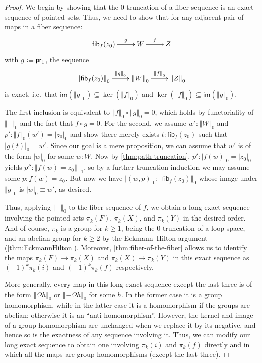 \documentclass[10pt,a4paper]{article}
\providecommand{\index}[1]{}
\newcommand{\jdeq}{\equiv}      %
\newcommand{\defeq}{\vcentcolon\equiv}  %
\newcommand{\proj}[1]{\ensuremath{\mathsf{pr}_{#1}}\xspace}
\newcommand{\im}{\ensuremath{\mathsf{im}}} %
\newcommand{\hfib}[2]{{\mathsf{fib}}_{#1}(#2)}
\newcommand{\trunc}[2]{\mathopen{}\left\Vert #2\right\Vert_{#1}\mathclose{}}
\newcommand{\truncf}[1]{\Vert \blank \Vert_{#1}}
\newcommand{\tproj}[3][]{\mathopen{}\left|#3\right|_{#2}^{#1}\mathclose{}}
\newcommand{\blank}{\mathord{\hspace{1pt}\text{--}\hspace{1pt}}}
\theoremstyle{definition}
\theoremstyle{remark}
\numberwithin{equation}{section}
\begin{document}
\begin{proof}
  We begin by showing that the 0-truncation of a fiber sequence is an exact sequence of pointed sets.
  Thus, we need to show that for any adjacent pair of maps in a fiber sequence:
  \[\xymatrix{\hfib{f}{z_0} \ar^-g[r] & W \ar^-f[r] & Z}\]
  with $g\defeq \proj1$, the sequence
  \[\xymatrix{\trunc{0}{\hfib{f}{z_0}} \ar^-{\trunc0g}[r] & \trunc0{W}
    \ar^-{\trunc0{f}}[r] & \trunc0{Z}}\]
  is exact, i.e.\ that $\im(\trunc0g)\subseteq\ker(\trunc0f)$ and $\ker(\trunc0f)\subseteq\im(\trunc0g)$.

  The first inclusion is equivalent to $\trunc0f\circ\trunc0g=0$, which holds by functoriality of $\truncf0$ and the fact that $f\circ g=0$.
  For the second, we assume $w':\trunc0W$ and $p':\trunc0f(w')=\tproj0{z_0}$ and show there merely exists ${t:\hfib{f}{z_0}}$ such that $\tproj0{g(t)}=w'$.
  Since our goal is a mere proposition, we can assume that $w'$ is of the
  form $\tproj0w$ for some $w:W$.
  Now by \cref{thm:path-truncation}, $p' : \tproj0{f(w)}=\tproj0{z_0}$ yields $p'': \trunc{-1}{f(w)=z_0}$, so by a further truncation induction we may assume some $p:f(w)=z_0$.
  But now we have $\tproj0{(w,p)}:\trunc{0}{\hfib{f}{z_0}}$ whose image under $\trunc0g$ is $\tproj0w\jdeq w'$, as desired.

  Thus, applying $\truncf0$ to the fiber sequence of $f$, we obtain a long exact sequence involving the pointed sets $\pi_k(F)$, $\pi_k(X)$, and $\pi_k(Y)$ in the desired order.
  And of course, $\pi_k$ is a group for $k\ge1$, being the 0-truncation of a loop space, and an abelian group for $k\ge 2$ by the Eckmann--Hilton argument
  \index{Eckmann--Hilton argument} (\cref{thm:EckmannHilton}).
  Moreover, \cref{thm:fiber-of-the-fiber} allows us to identify the maps $\pi_k(F) \to \pi_k(X)$ and $\pi_k(X) \to \pi_k(Y)$ in this exact sequence as $(-1)^k \pi_k(i)$ and $(-1)^k \pi_k(f)$ respectively.

  More generally, every map in this long exact sequence except the last three is of the form $\trunc0{\Omega h}$ or $\trunc0{-\Omega h}$ for some $h$.
  In the former case it is a group homomorphism, while in the latter case it is a homomorphism if the groups are abelian; otherwise it is an ``anti-homomorphism''.
  However, the kernel and image of a group homomorphism are unchanged when we replace it by its negative, and hence so is the exactness of any sequence involving it.
  Thus, we can modify our long exact sequence to obtain one involving $\pi_k(i)$ and $\pi_k(f)$ directly and in which all the maps are group homomorphisms (except the last three).
\end{proof}
\end{document}

